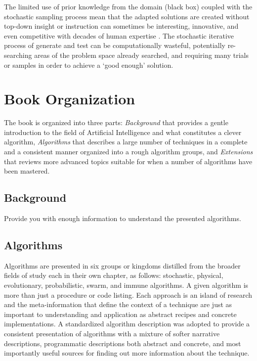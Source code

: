The limited use of prior knowledge from the domain (black box) coupled with the stochastic sampling process mean that the adapted solutions are created without top-down insight or instruction can sometimes be interesting, innovative, and even competitive with decades of human expertise \cite{Koza2003}. The stochastic iterative process of generate and test can be computationally wasteful, potentially re-searching areas of the problem space already searched, and requiring many trials or samples in order to achieve a `good enough' solution.


% 
% 
\section{Book Organization}
\label{intro:sec:organization}
The book is organized into three parts: \emph{Background} that provides a gentle introduction to the field of Artificial Intelligence and what constitutes a clever algorithm, \emph{Algorithms} that describes a large number of techniques in a complete and a consistent manner organized into a rough algorithm groups, and \emph{Extensions} that reviews more advanced topics suitable for when a number of algorithms have been mastered.

% 
% 
\subsection{Background}
Provide you with enough information to understand the presented algorithms.

% 
%
\subsection{Algorithms}
Algorithms are presented in six groups or kingdoms distilled from the broader fields of study each in their own chapter, as follows: stochastic, physical, evolutionary, probabilistic, swarm, and immune algorithms.  
A given algorithm is more than just a procedure or code listing. Each approach is an island of research and the meta-information that define the context of a technique are just as important to understanding and application as abstract recipes and concrete implementations. A standardized algorithm description was adopted to provide a consistent presentation of algorithms with a mixture of softer narrative descriptions, programmatic descriptions both abstract and concrete, and most importantly useful sources for finding out more information about the technique.  

